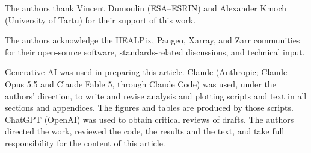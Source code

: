\documentclass[journal]{IEEEtran}
\begin{document}
The authors thank Vincent Dumoulin (ESA--ESRIN) and Alexander Kmoch (University of Tartu) for their support of this work.

The authors acknowledge the HEALPix, Pangeo, Xarray, and Zarr communities for their open-source software, standards-related discussions, and technical input.

Generative AI was used in preparing this article. Claude (Anthropic; Claude Opus 5.5 and Claude Fable 5, through Claude Code) was used, under the authors' direction, to write and revise analysis and plotting scripts and text in all sections and appendices. The figures and tables are produced by those scripts. ChatGPT (OpenAI) was used to obtain critical reviews of drafts. The authors directed the work, reviewed the code, the results and the text, and take full responsibility for the content of this article.



\end{document}
